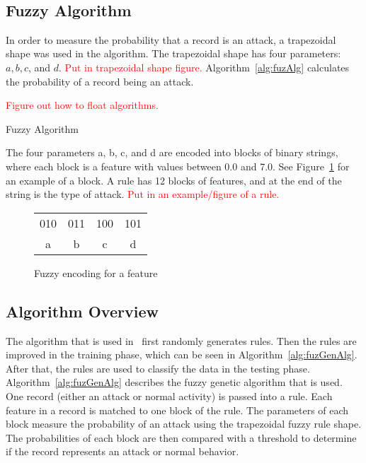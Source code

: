 \documentclass{sig-alternate}
\newcommand{\mycomment}[1]{\textcolor{red}{#1}}
\begin{document}
~\cite{KDD99}




\subsection{Fuzzy Algorithm}
In order to measure the probability that a record is an attack, a trapezoidal shape was used in the algorithm. The trapezoidal shape has four parameters: $a, b, c$, and $d$. 
\mycomment{Put in trapezoidal shape figure.} Algorithm~\ref{alg:fuzAlg} calculates the probability of a record being an attack.

\mycomment{Figure out how to float algorithms.}
\begin{algorithm}
\caption{Fuzzy Algorithm}
\label{alg:fuzAlg}
\begin{algorithmic}
\ELSE {}
\ENDIF
\end{algorithmic}
\end{algorithm}

The four parameters a, b, c, and d are encoded into blocks of binary strings, where each block is a feature with values between 0.0 and 7.0. See Figure~\ref{fig:fuzEncodingForFeature} for an example of a block. A rule has 12 blocks of features, and at the end of the string is the type of attack.
\mycomment{Put in an example/figure of a rule.}

\begin{figure}
\centering
\caption{Fuzzy encoding for a feature}
\begin{tabular}{|c|c|c|c|} \hline
010 & 011 & 100 & 101\\
a & b & c & d\\
\hline\end{tabular}
\label{fig:fuzEncodingForFeature}
\end{figure}




\subsection{Algorithm Overview}
The algorithm that is used in~\cite{6496342, 6559603} first randomly generates rules. Then the rules are improved in the training phase, which can be seen in Algorithm~\ref{alg:fuzGenAlg}. After that, the rules are used to classify the data in the testing phase. Algorithm~\ref{alg:fuzGenAlg} describes the fuzzy genetic algorithm that is used. One record (either an attack or normal activity) is passed into a rule. Each feature in a record is matched to one block of the rule. The parameters of each block measure the probability of an attack using the trapezoidal fuzzy rule shape. The probabilities of each block are then compared with a threshold to determine if the record represents an attack or normal behavior.
\end{document}
